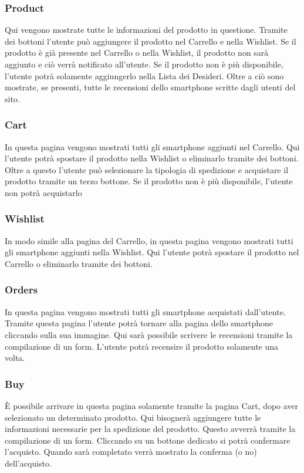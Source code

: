 \documentclass[12pt]{extarticle}
\begin{document}
\subsubsection{Product}
Qui vengono mostrate tutte le informazioni del prodotto in questione.
Tramite dei bottoni l'utente può aggiungere il prodotto nel Carrello e nella Wishlist. Se il prodotto è
già presente nel Carrello o nella Wishlist, il prodotto non sarà aggiunto e ciò verrà notificato
all'utente. Se il prodotto non è più disponibile, l'utente potrà solamente aggiungerlo nella Lista dei
Desideri. Oltre a ciò sono mostrate, se presenti, tutte le recensioni dello smartphone scritte dagli
utenti del sito. 

\subsubsection{Cart}
In questa pagina vengono mostrati tutti gli smartphone aggiunti nel Carrello. Qui l'utente potrà
spostare il prodotto nella Wishlist o eliminarlo tramite dei bottoni. Oltre a questo l'utente può
selezionare la tipologia di spedizione e acquistare il prodotto tramite un terzo bottone. Se il
prodotto non è più disponibile, l'utente non potrà acquistarlo

\subsubsection{Wishlist}
In modo simile alla pagina del Carrello, in questa pagina vengono mostrati tutti gli smartphone
aggiunti nella Wishlist. Qui l'utente potrà spostare il prodotto nel Carrello o eliminarlo tramite dei
bottoni.

\subsubsection{Orders}
In questa pagina vengono mostrati tutti gli smartphone acquistati dall'utente. Tramite questa
pagina l'utente potrà tornare alla pagina dello smartphone cliccando sulla sua immagine. Qui sarà
possibile scrivere le recensioni tramite la compilazione di un form. L'utente potrà recensire il
prodotto solamente una volta.

\subsubsection{Buy}
È possibile arrivare in questa pagina solamente tramite la pagina Cart, dopo aver selezionato un
determinato prodotto. Qui bisognerà aggiungere tutte le informazioni necessarie per la spedizione
del prodotto. Questo avverrà tramite la compilazione di un form. Cliccando su un bottone
dedicato si potrà confermare l'acquisto. Quando sarà completato verrà mostrato la conferma (o
no) dell'acquisto.
\end{document}

